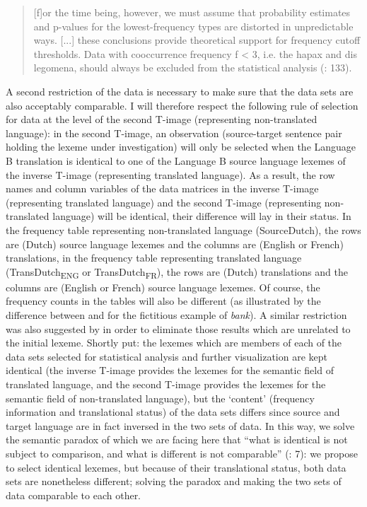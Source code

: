 \begin{quote}
[f]or the time being, however, we must assume that probability estimates and p-values for the lowest-frequency types are distorted in unpredictable ways. [...] these conclusions provide theoretical support for frequency cutoff thresholds. Data with cooccurrence frequency f < 3, i.e. the hapax and dis legomena, should always be excluded from the statistical analysis (\citealt{evert_statistics_2004}: 133).
\end{quote}


A second restriction of the data is necessary to make sure that the data sets are also acceptably comparable. I will therefore respect the following rule of selection for data at the level of the second T-image (representing non-translated language): in the second T-image, an observation (source-target sentence pair holding the lexeme under investigation) will only be selected when the Language B translation is identical to one of the Language B source language lexemes of the inverse T-image (representing translated language). As a result, the row names and column variables of the data matrices in the inverse T-image (representing translated language) and the second T-image (representing non-translated language) will be identical, their difference will lay in their status. In the frequency table representing non-translated language (SourceDutch), the rows are (Dutch) source language lexemes and the columns are (English or French) translations, in the frequency table representing translated language (TransDutch\textsubscript{ENG} or TransDutch\textsubscript{FR}), the rows are (Dutch) translations and the columns are (English or French) source language lexemes. Of course, the frequency counts in the tables will also be different (as illustrated by the difference between  and  for the fictitious example of \textit{bank}). A similar restriction was also suggested by \citet[60]{johansson_translational_1998} in order to eliminate those results which are unrelated to the initial lexeme. Shortly put: the lexemes which are members of each of the data sets selected for statistical analysis and further visualization are kept identical (the inverse T-image provides the lexemes for the semantic field of translated language, and the second T-image provides the lexemes for the semantic field of non-translated language), but the ‘content’ (frequency information and translational status) of the data sets differs since source and target language are in fact inversed in the two sets of data. In this way, we solve the semantic paradox of \citet{krzeszowski_contrasting_1990} which we are facing here that “what is identical is not subject to comparison, and what is different is not comparable” (\citealt{krzeszowski_contrasting_1990}: 7): we propose to select identical lexemes, but because of their translational status, both data sets are nonetheless different; solving the paradox and making the two sets of data comparable to each other.



